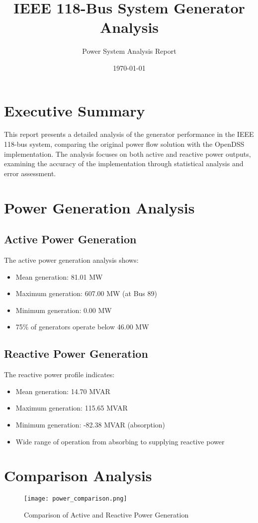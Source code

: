 \documentclass[11pt]{article}
\title{IEEE 118-Bus System Generator Analysis}
\author{Power System Analysis Report}
\date{\today}
\begin{document}
\maketitle

\section{Executive Summary}
This report presents a detailed analysis of the generator performance in the IEEE 118-bus system, comparing the original power flow solution with the OpenDSS implementation. The analysis focuses on both active and reactive power outputs, examining the accuracy of the implementation through statistical analysis and error assessment.

\section{Power Generation Analysis}

\subsection{Active Power Generation}
The active power generation analysis shows:
\begin{itemize}
    \item Mean generation: 81.01 MW
    \item Maximum generation: 607.00 MW (at Bus 89)
    \item Minimum generation: 0.00 MW
    \item 75\% of generators operate below 46.00 MW
\end{itemize}

\subsection{Reactive Power Generation}
The reactive power profile indicates:
\begin{itemize}
    \item Mean generation: 14.70 MVAR
    \item Maximum generation: 115.65 MVAR
    \item Minimum generation: -82.38 MVAR (absorption)
    \item Wide range of operation from absorbing to supplying reactive power
\end{itemize}

\section{Comparison Analysis}
\begin{figure}[H]
    \centering
    \texttt{[image: power\_comparison.png]}
    \caption{Comparison of Active and Reactive Power Generation}
    \label{fig:power_comparison}
\end{figure}
\end{document}
